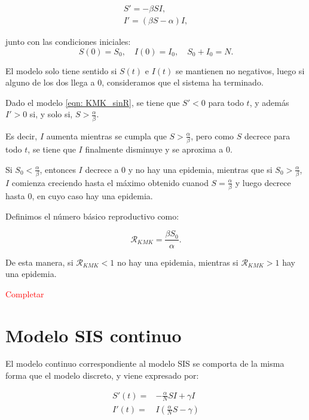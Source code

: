 \begin{equation}
\label{eqn: KMK_sinR}
\begin{aligned}
S' = -\beta SI, \\
I' = (\beta S - \alpha ) I,
\end{aligned}
\end{equation}

junto con las condiciones iniciales:
$$S(0)=S_0, \quad I(0)=I_0, \quad S_0+I_0=N.$$

El modelo solo tiene sentido si $S(t)$ e $I(t)$ se mantienen no negativos, luego si alguno de los dos llega a $0$, consideramos que el sistema ha terminado.

\begin{lemma}
Dado el modelo \eqref{eqn: KMK_sinR}, se tiene que $S'<0$ para todo $t$, y además $I'>0$ si, y solo si, $S>\frac{\alpha}{\beta}$.
\end{lemma}

Es decir, $I$ aumenta mientras se cumpla que $S>\frac{\alpha}{\beta}$, pero como $S$ decrece para todo $t$, se tiene que $I$ finalmente disminuye y se aproxima a $0$.

Si $S_0<\frac{\alpha}{\beta}$, entonces $I$ decrece a $0$ y no hay una epidemia, mientras que si $S_0>\frac{\alpha}{\beta}$, $I$ comienza creciendo hasta el máximo obtenido cuanod $S=\frac{\alpha}{\beta}$ y luego decrece hasta $0$, en cuyo caso hay una epidemia.

Definimos el número básico reproductivo como:

$$\mathcal{R}_{KMK}=\frac{\beta S_0}{\alpha}.$$

De esta manera, si $\mathcal{R}_{KMK}<1$ no hay una epidemia, mientras si $\mathcal{R}_{KMK}>1$ hay una epidemia. 

\textcolor{red}{Completar}


\section{Modelo SIS continuo}

El modelo continuo correspondiente al modelo SIS se comporta de la misma forma que el modelo discreto, y viene expresado por:

\begin{equation}
\label{eqn: modelo_SIS_continuo}
\begin{aligned}
S'(t) = & -\frac{\alpha}{N}SI+\gamma I \\
I'(t) = & I\left( \frac{\alpha}{N}S-\gamma \right) \\
\end{aligned}
\end{equation}

